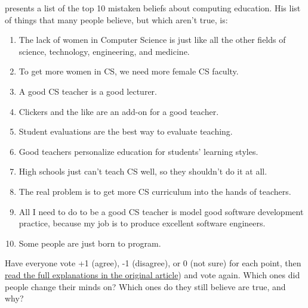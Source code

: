 
\cite{Guzd2015b} presents a list of the top 10 mistaken beliefs about
computing education.  His list of things that many people believe, but
which aren't true, is:

\begin{enumerate}

\item
  The lack of women in Computer Science is just like all the other
  fields of science, technology, engineering, and medicine.

\item
  To get more women in CS, we need more female CS faculty.

\item
  A good CS teacher is a good lecturer.

\item
  Clickers and the like are an add-on for a good teacher.

\item
  Student evaluations are the best way to evaluate teaching.

\item
  Good teachers personalize education for students' learning styles.

\item
  High schools just can't teach CS well, so they shouldn't do it at
  all.

\item
  The real problem is to get more CS curriculum into the hands of
  teachers.

\item
  All I need to do to be a good CS teacher is model good software
  development practice, because my job is to produce excellent
  software engineers.

\item
  Some people are just born to program.

\end{enumerate}

\noindent
Have everyone vote +1 (agree), -1 (disagree), or 0 (not sure) for each
point, then
\href{https://cacm.acm.org/blogs/blog-cacm/189498-top-10-myths-about-teaching-computer-science/fulltext}{read
  the full explanations in the original article}) and vote again.
Which ones did people change their minds on?  Which ones do they still
believe are true, and why?
